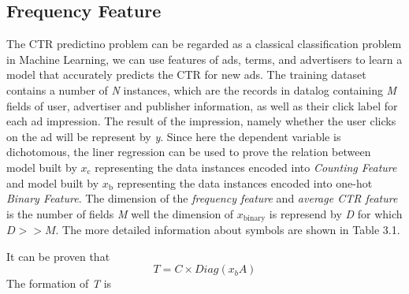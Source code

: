 \subsection{Frequency Feature}

The CTR predictino problem can be regarded as a classical classification problem in Machine Learning, we can use features of ads, terms, and advertisers to learn a model that accurately predicts the CTR for new ads. The training dataset contains a number of \textsl{N} instances, which are the records in datalog containing \textsl{M} fields of user, advertiser and publisher information, as well as their click label for each ad impression. The result of the impression, namely whether the user clicks on the ad will be represent by \textsl{y}. Since here the dependent variable is dichotomous, the liner regression can be used to prove the relation between model built by \(x_{\text{c}}\) representing the data instances encoded into \textsl{Counting Feature} and model built by \(x_{\text{b}}\) representing the data instances encoded into one-hot \textsl{Binary Feature}. The dimension of the \textit{frequency feature} and \textit{average CTR feature} is the number of fields \textsl{M} well the dimension of \(x_{\text{binary}}\) is represend by \textsl{D} for which \(D >> M\). The more detailed information about symbols are shown in Table 3.1.

 It can be proven that 
\[ T = C\times Diag(x_{b}A) \]
The formation of \textsl{T} is 

